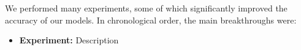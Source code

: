 \documentclass[11pt]{article}
\begin{document}
\begin{multicols}{2}

      We performed many experiments, some of which significantly improved the accuracy of our models. In chronological order, the main breakthroughs were:
      \begin{itemize}[leftmargin=*]
            \setlength\itemsep{0em}
            \item \textbf{Experiment:} Description
      \end{itemize}





\end{multicols}
\end{document}
